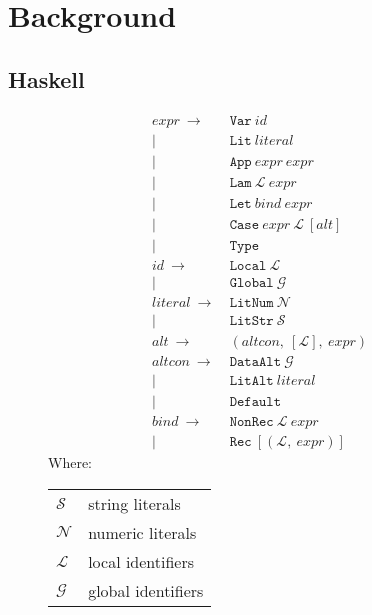 \section{Background}
\label{sec:background}

\subsection{Haskell}
\label{sec:haskell}

\begin{figure}
  \begin{equation*}
    \begin{split}
      expr\    \rightarrow\ & \texttt{Var}\ id                                       \\
                         |\ & \texttt{Lit}\ literal                                  \\
                         |\ & \texttt{App}\ expr\ expr                               \\
                         |\ & \texttt{Lam}\ \mathcal{L}\ expr                        \\
                         |\ & \texttt{Let}\ bind\ expr                               \\
                         |\ & \texttt{Case}\ expr\ \mathcal{L}\ \left[ alt \right]   \\
                         |\ & \texttt{Type}                                          \\
      id\      \rightarrow\ & \texttt{Local}\ \mathcal{L}                            \\
                         |\ & \texttt{Global}\ \mathcal{G}                           \\
      literal\ \rightarrow\ & \texttt{LitNum}\ \mathcal{N}                           \\
                         |\ & \texttt{LitStr}\ \mathcal{S}                           \\
      alt\     \rightarrow\ & ( altcon,\ [\mathcal{L}],\ expr )                      \\
      altcon\  \rightarrow\ & \texttt{DataAlt}\ \mathcal{G}                          \\
                         |\ & \texttt{LitAlt}\ literal                               \\
                         |\ & \texttt{Default}                                       \\
      bind\    \rightarrow\ & \texttt{NonRec}\ \mathcal{L}\ expr                     \\
                         |\ & \texttt{Rec}\ [ ( \mathcal{L},\ expr ) ]
    \end{split}
  \end{equation*}
  Where:
  \begin{tabular}[t]{l @{ $=$ } l}
    $\mathcal{S}$ & string literals    \\
    $\mathcal{N}$ & numeric literals   \\
    $\mathcal{L}$ & local identifiers  \\
    $\mathcal{G}$ & global identifiers
  \end{tabular}


\end{figure}
